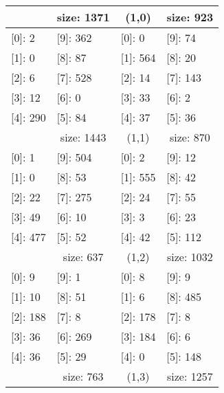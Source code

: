 \documentclass[a4paper,12pt]{report}
\begin{document}
\begin{longtable}[c]{llll}
\rowcolor[HTML]{D9D9D9}
\multicolumn{1}{c}{\cellcolor[HTML]{D9D9D9}(0,0)} & \multicolumn{1}{c}{\cellcolor[HTML]{D9D9D9}size: 1371} & \multicolumn{1}{c}{\cellcolor[HTML]{D9D9D9}(1,0)} & \multicolumn{1}{c}{\cellcolor[HTML]{D9D9D9}size: 923} \\
\endfirsthead
%
\endhead
%
\endfoot
%
\endlastfoot
%
{[}0{]}: 2 & {[}9{]}: 362 & {[}0{]}: 0 & {[}9{]}: 74 \\
{[}1{]}: 0 & {[}8{]}: 87 & {[}1{]}: 564 & {[}8{]}: 20 \\
{[}2{]}: 6 & {[}7{]}: 528 & {[}2{]}: 14 & {[}7{]}: 143 \\
{[}3{]}: 12 & {[}6{]}: 0 & {[}3{]}: 33 & {[}6{]}: 2 \\
{[}4{]}: 290 & {[}5{]}: 84 & {[}4{]}: 37 & {[}5{]}: 36 \\
\rowcolor[HTML]{D9D9D9} 
\multicolumn{1}{c}{\cellcolor[HTML]{D9D9D9}(0,1)} & \multicolumn{1}{c}{\cellcolor[HTML]{D9D9D9}size: 1443} & \multicolumn{1}{c}{\cellcolor[HTML]{D9D9D9}(1,1)} & \multicolumn{1}{c}{\cellcolor[HTML]{D9D9D9}size: 870} \\
{[}0{]}: 1 & {[}9{]}: 504 & {[}0{]}: 2 & {[}9{]}: 12 \\
{[}1{]}: 0 & {[}8{]}: 53 & {[}1{]}: 555 & {[}8{]}: 42 \\
{[}2{]}: 22 & {[}7{]}: 275 & {[}2{]}: 24 & {[}7{]}: 55 \\
{[}3{]}: 49 & {[}6{]}: 10 & {[}3{]}: 3 & {[}6{]}: 23 \\
{[}4{]}: 477 & {[}5{]}: 52 & {[}4{]}: 42 & {[}5{]}: 112 \\
\rowcolor[HTML]{D9D9D9} 
\multicolumn{1}{c}{\cellcolor[HTML]{D9D9D9}(0,2)} & \multicolumn{1}{c}{\cellcolor[HTML]{D9D9D9}size: 637} & \multicolumn{1}{c}{\cellcolor[HTML]{D9D9D9}(1,2)} & \multicolumn{1}{c}{\cellcolor[HTML]{D9D9D9}size: 1032} \\
{[}0{]}: 9 & {[}9{]}: 1 & {[}0{]}: 8 & {[}9{]}: 9 \\
{[}1{]}: 10 & {[}8{]}: 51 & {[}1{]}: 6 & {[}8{]}: 485 \\
{[}2{]}: 188 & {[}7{]}: 8 & {[}2{]}: 178 & {[}7{]}: 8 \\
{[}3{]}: 36 & {[}6{]}: 269 & {[}3{]}: 184 & {[}6{]}: 6 \\
{[}4{]}: 36 & {[}5{]}: 29 & {[}4{]}: 0 & {[}5{]}: 148 \\
\rowcolor[HTML]{D9D9D9} 
\multicolumn{1}{c}{\cellcolor[HTML]{D9D9D9}(0,3)} & \multicolumn{1}{c}{\cellcolor[HTML]{D9D9D9}size: 763} & \multicolumn{1}{c}{\cellcolor[HTML]{D9D9D9}(1,3)} & \multicolumn{1}{c}{\cellcolor[HTML]{D9D9D9}size: 1257} \\

\end{longtable}
\end{document}
